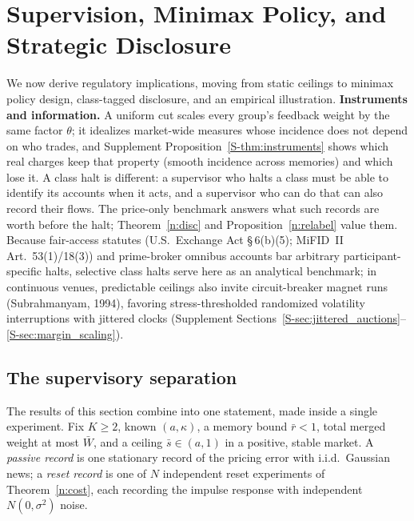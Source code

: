 \documentclass[11pt,letterpaper]{article}
\theoremstyle{definition}
\begin{document}
\section{Supervision, Minimax Policy, and Strategic Disclosure}\label{sec:supervision}

We now derive regulatory implications, moving from static ceilings to minimax policy design, class-tagged disclosure, and an empirical illustration. \textbf{Instruments and information.} A uniform cut scales every group's feedback weight by the same factor $\theta$; it idealizes market-wide measures whose incidence does not depend on who trades, and Supplement Proposition~\ref{S-thm:instruments} shows which real charges keep that property (smooth incidence across memories) and which lose it. A class halt is different: a supervisor who halts a class must be able to identify its accounts when it acts, and a supervisor who can do that can also record their flows. The price-only benchmark answers what such records are worth before the halt; Theorem~\ref{n:disc} and Proposition~\ref{n:relabel} value them. Because fair-access statutes (U.S.\ Exchange Act \S\,6(b)(5); MiFID~II Art.\ 53(1)/18(3)) and prime-broker omnibus accounts bar arbitrary participant-specific halts, selective class halts serve here as an analytical benchmark; in continuous venues, predictable ceilings also invite circuit-breaker magnet runs (Subrahmanyam, 1994), favoring stress-thresholded randomized volatility interruptions with jittered clocks (Supplement Sections~\ref{S-sec:jittered_auctions}--\ref{S-sec:margin_scaling}).

\subsection{The supervisory separation}\label{sec:separation}

The results of this section combine into one statement, made inside a single experiment. Fix $K \ge 2$, known $(a, \kappa)$, a memory bound $\bar r < 1$, total merged weight at most $\bar W$, and a ceiling $\bar s \in (a, 1)$ in a positive, stable market. A \emph{passive record} is one stationary record of the pricing error with i.i.d.\ Gaussian news; a \emph{reset record} is one of $N$ independent reset experiments of Theorem~\ref{n:cost}, each recording the impulse response with independent $N(0, \sigma^2)$ noise.
\end{document}
